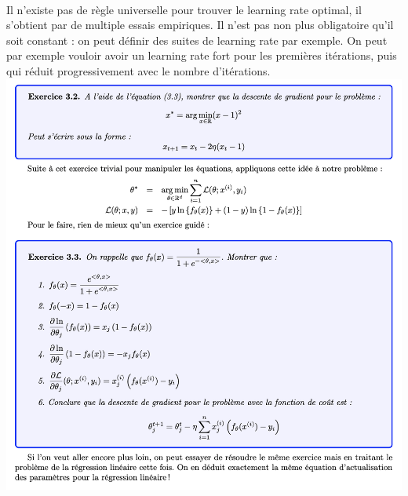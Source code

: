 \\
Il n’existe pas de règle universelle pour trouver le learning rate optimal, il s’obtient par de multiple essais empiriques. Il n’est pas non plus obligatoire qu’il soit constant : on peut définir des suites de learning rate par exemple. On peut par exemple vouloir avoir un learning rate fort pour les premières itérations, puis qui réduit progressivement avec le nombre d’itérations.
\\
\includegraphics[width=\linewidth]{./img/notions_math/gradiant_descent/exercices}
